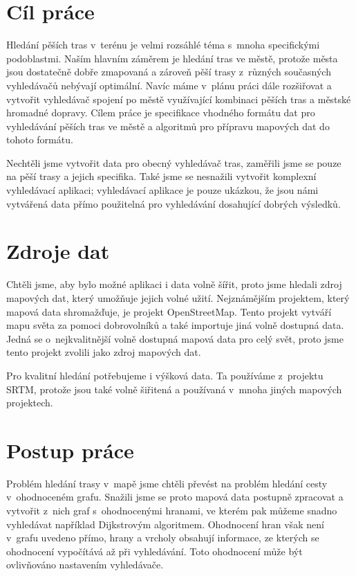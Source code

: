 \section{Cíl práce}
Hledání pěších tras v~terénu je velmi rozsáhlé téma s~mnoha specifickými
podoblastmi. Naším hlavním záměrem je hledání tras ve městě,
protože města jsou dostatečně dobře zmapovaná a zároveň pěší trasy z~různých
současných vyhledávačů nebývají optimální. Navíc máme v~plánu práci dále
rozšiřovat a vytvořit vyhledávač spojení po městě využívající kombinaci pěších
tras a městské hromadné dopravy.  Cílem práce je specifikace vhodného formátu
dat pro vyhledávání pěších tras ve městě a algoritmů pro přípravu mapových dat
do tohoto formátu. 

Nechtěli jsme vytvořit data pro obecný vyhledávač tras, zaměřili jsme se
pouze na pěší trasy a jejich specifika. Také jsme se nesnažili vytvořit komplexní
vyhledávací aplikaci; vyhledávací aplikace je pouze ukázkou, že jsou námi
vytvářená data přímo použitelná pro vyhledávání dosahující dobrých výsledků.

\section{Zdroje dat}
Chtěli jsme, aby bylo možné aplikaci i data volně šířit, proto jsme hledali
zdroj mapových dat, který umožňuje jejich volné užití. Nejznámějším projektem,
který mapová data shromažďuje, je projekt OpenStreetMap. Tento projekt vytváří
mapu světa za pomoci dobrovolníků a také importuje jiná volně dostupná data.
Jedná se o~nejkvalitnější volně dostupná mapová data pro celý svět, proto jsme
tento projekt zvolili jako zdroj mapových dat.

Pro kvalitní hledání potřebujeme i výšková data. Ta používáme z~projektu SRTM,
\cite{srtmweb} protože jsou také volně šiřitená a používaná v~mnoha jiných
mapových projektech.

\section{Postup práce}
Problém hledání trasy v~mapě jsme chtěli převést na problém hledání cesty
v~ohodnoceném grafu. Snažili jsme se proto mapová data postupně zpracovat a
vytvořit z~nich graf s~ohodnocenými hranami, ve kterém pak můžeme snadno
vyhledávat například Dijkstrovým algoritmem. Ohodnocení hran však není v~grafu
uvedeno přímo, hrany a vrcholy obsahují informace, ze kterých se  ohodnocení
vypočítává až při vyhledávání. Toto ohodnocení může být ovlivňováno nastavením
vyhledávače.

